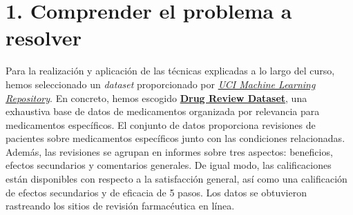 \documentclass[spanish,]{article}
\begin{document}
\vspace{0.15cm}


\vspace{0.15cm}


\vspace{0.15cm}


\vspace{0.15cm}

\newpage

\thispagestyle{empty} \tableofcontents
\newpage

\thispagestyle{empty} \listoffigures
\newpage

\thispagestyle{empty} \listoftables
\newpage

\pagestyle{fancy} \fancyhf{}
\rhead{\thepage} \setcounter{page}{1}

\section{1. Comprender el problema a
resolver}\label{comprender-el-problema-a-resolver}

Para la realización y aplicación de las técnicas explicadas a lo largo
del curso, hemos seleccionado un \emph{dataset} proporcionado por
\href{https://archive.ics.uci.edu/ml/index.php}{\emph{UCI Machine
Learning Repository}}. En concreto, hemos escogido
\href{https://archive.ics.uci.edu/ml/datasets/Drug+Review+Dataset+\%28Druglib.com\%29}{\textbf{Drug
Review Dataset}}, una exhaustiva base de datos de medicamentos
organizada por relevancia para medicamentos específicos. El conjunto de
datos proporciona revisiones de pacientes sobre medicamentos específicos
junto con las condiciones relacionadas. Además, las revisiones se
agrupan en informes sobre tres aspectos: beneficios, efectos secundarios
y comentarios generales. De igual modo, las calificaciones están
disponibles con respecto a la satisfacción general, así como una
calificación de efectos secundarios y de eficacia de 5 pasos. Los datos
se obtuvieron rastreando los sitios de revisión farmacéutica en línea.
\end{document}
